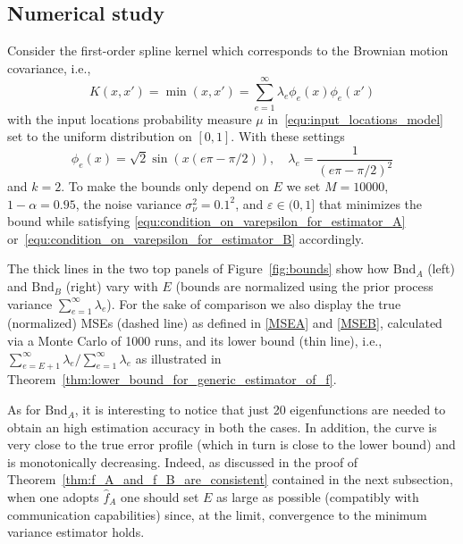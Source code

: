 \documentclass[10pt,twocolumn,twoside]{IEEEtran}					%
\theoremstyle	{plain}
\newcommand	{\Figure}				[0]	{Figure}
\newcommand	{\Theorem}				[0]	{Theorem}
\begin{document}
\subsection{Numerical study}
\label{exa:increasing_E_can_lead_to_a_performance_loss}
	Consider the first-order spline kernel \cite{Wahba1990} which corresponds to the Brownian motion covariance, i.e.,
	\begin{equation}
		K(x,x') = \min(x,x') = \sum_{e=1}^\infty \lambda_{e} \phi_{e}(x) \phi_{e} (x')
	\end{equation}
	with the input locations probability measure $\mu$ in~\eqref{equ:input_locations_model} set to the uniform distribution on $[0,1]$. With these settings
	\begin{equation}
		\label{Exp1}
	 \phi_{e}(x) = \sqrt{2} \sin \left(x (e\pi - \pi/2)\right), \quad \lambda_e = \frac{1}{(e\pi - \pi/2)^2} 
	\end{equation}
	and $k=2$. To make the bounds only depend on $E$ we set $M=10000$, $1-\alpha=0.95$, the noise variance $\sigma^{2}_{\nu}=0.1^2$, and $\varepsilon \in (0, 1]$ that minimizes the bound while satisfying \eqref{equ:condition_on_varepsilon_for_estimator_A} or~\eqref{equ:condition_on_varepsilon_for_estimator_B} accordingly.

	The thick lines in the two top panels of \Figure~\ref{fig:bounds} show how $\mathrm{Bnd}_{A}$ (left) and $\mathrm{Bnd}_{B}$ (right) vary with $E$ (bounds are normalized using the prior process variance $\sum_{e=1}^\infty \lambda_{e}$). For the sake of comparison we also display the true (normalized) \acp{MSE} (dashed line) as defined in \eqref{MSEA} and \eqref{MSEB}, calculated via a Monte Carlo of 1000 runs, and its lower bound (thin line), i.e., $\sum_{e=E+1}^\infty \lambda_{e}/\sum_{e=1}^\infty \lambda_{e}$ as illustrated in \Theorem~\ref{thm:lower_bound_for_generic_estimator_of_f}.

As for $\mathrm{Bnd}_{A}$, it is interesting to notice that just 20 eigenfunctions are needed to obtain an high estimation accuracy in both the cases. In addition, the curve is very close to the true error profile (which in turn is close to the lower bound) and is monotonically decreasing. Indeed, as discussed in the proof of \Theorem~\ref{thm:f_A_and_f_B_are_consistent} contained in the next subsection, when one adopts $\widehat{f}_{A}$ one should set $E$ as large as possible (compatibly with communication capabilities) since, at the limit, convergence to the minimum variance estimator holds.
\end{document}
